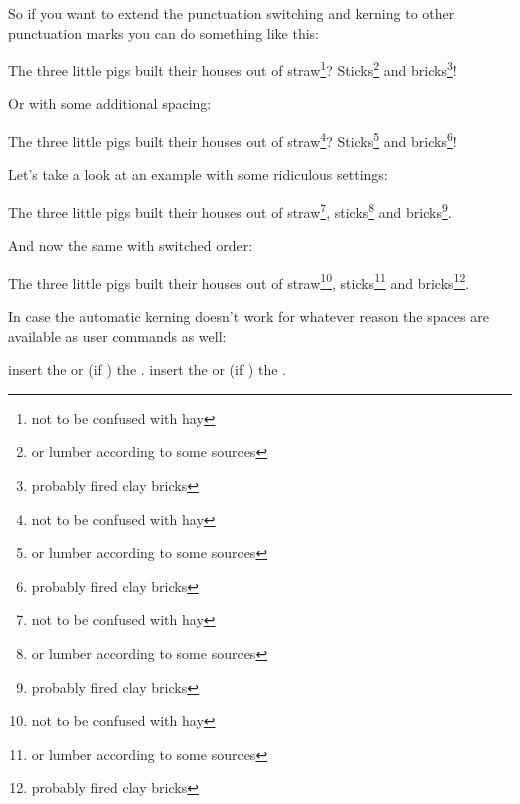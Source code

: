 \documentclass[toc=index,toc=bib]{cnpkgdoc}
\begin{document}
So if you want to extend the punctuation switching and kerning to other punctuation
marks you can do something like this:
\begin{beispiel}
 \begin{minipage}{.4\linewidth}
  \noindent The three little pigs built their houses
  out of straw\footnote{not to be confused with hay}?
  Sticks\footnote{or lumber according to some sources}
  and bricks\footnote{probably fired clay bricks}!
 \end{minipage}
\end{beispiel}

Or with some additional spacing:
\begin{beispiel}
 \begin{minipage}{.4\linewidth}
  \noindent The three little pigs built their houses
  out of straw\footnote{not to be confused with hay}?
  Sticks\footnote{or lumber according to some sources}
  and bricks\footnote{probably fired clay bricks}!
 \end{minipage}
\end{beispiel}

Let's take a look at an example with some ridiculous settings:
\begin{beispiel}
 \begin{minipage}{.4\linewidth}
  \noindent The three little pigs built their houses
  out of straw\footnote{not to be confused with hay},
  sticks\footnote{or lumber according to some sources}
  and bricks\footnote{probably fired clay bricks}.
 \end{minipage}
\end{beispiel}

And now the same with switched order:
\begin{beispiel}
 \begin{minipage}{.4\linewidth}
  \noindent The three little pigs built their houses
  out of straw\footnote{not to be confused with hay},
  sticks\footnote{or lumber according to some sources}
  and bricks\footnote{probably fired clay bricks}.
 \end{minipage}
\end{beispiel}

In case the automatic kerning doesn't work for whatever reason the spaces are
available as user commands as well:
\begin{beschreibung}
  insert the  or (if )
 the .
  insert the  or (if )
 the .
\end{beschreibung}
\end{document}
